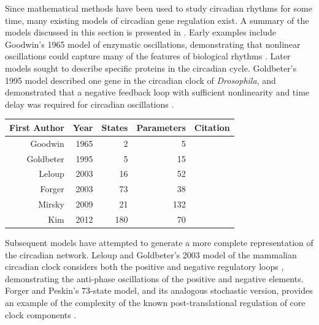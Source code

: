 Since mathematical methods have been used to study circadian rhythms for some time, many existing models of circadian gene regulation exist.
A summary of the models discussed in this section is presented in .
Early examples include Goodwin's 1965 model of enzymatic oscillations, demonstrating that nonlinear oscillations could capture many of the features of biological rhythms \cite{Goodwin1965}. 
Later models sought to describe specific proteins in the circadian cycle. 
Goldbeter's 1995 model described one gene in the circadian clock of {\it Drosophila}, and demonstrated that a negative feedback loop with sufficient nonlinearity and time delay was required for circadian oscillations \cite{Goldbeter1995}.

\begin{table}[tbp]
  \centering
\begin{tabular}{rrrrc}\toprule
First Author & Year & States & Parameters & Citation             \\\midrule
Goodwin      & 1965 & 2      & 5          & \cite{Goodwin1965}   \\
Goldbeter    & 1995 & 5      & 15         & \cite{Goldbeter1995} \\
Leloup       & 2003 & 16     & 52         & \cite{Leloup2003}    \\
Forger       & 2003 & 73     & 38         & \cite{Forger2003}    \\
Mirsky       & 2009 & 21     & 132        & \cite{Mirsky2009}    \\
Kim          & 2012 & 180    & 70         & \cite{Kim2012}       \\\bottomrule
\end{tabular}
\label{tab:models}
\end{table}


Subsequent models have attempted to generate a more complete representation of the circadian network. 
Leloup and Goldbeter's 2003 model of the mammalian circadian clock considers both the positive and negative regulatory loops \cite{Leloup2003}, demonstrating the anti-phase oscillations of the positive and negative elements. 
Forger and Peskin's 73-state model, and its analogous stochastic version, provides an example of the complexity of the known post-translational regulation of core clock components \cite{Forger2003,Forger2005}.

